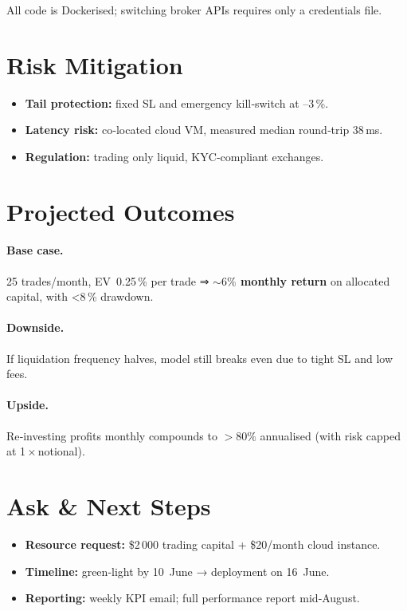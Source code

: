 \documentclass[a4paper,12pt]{article}
\begin{document}
All code is Dockerised; switching broker APIs
requires only a credentials file.

\section{Risk Mitigation}

\begin{itemize}
  \item \textbf{Tail protection:} fixed SL and emergency kill‑switch at –3 \%.
  \item \textbf{Latency risk:} co‑located cloud VM, measured median
        round‑trip 38 ms.
  \item \textbf{Regulation:} trading only liquid, KYC‑compliant exchanges.
\end{itemize}

\section{Projected Outcomes}

\paragraph{Base case.}
25 trades/month, EV 0.25 \% per trade ⇒ \textbf{\(\sim6\%\) monthly
return} on allocated capital, with <8 \% drawdown.

\paragraph{Downside.}
If liquidation frequency halves, model still breaks even due to
tight SL and low fees.

\paragraph{Upside.}
Re‑investing profits monthly compounds to \(>\!80\%\) annualised
(with risk capped at 1 × notional).

\section{Ask \& Next Steps}

\begin{itemize}
  \item \textbf{Resource request:} \$2 000 trading capital +
        \$20/month cloud instance.
  \item \textbf{Timeline:} green‑light by 10 June → deployment on 16 June.
  \item \textbf{Reporting:} weekly KPI email; full performance report
        mid‑August.
\end{itemize}
\end{document}
